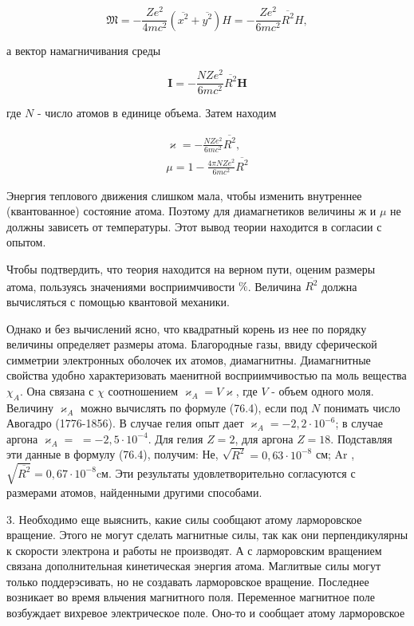 \documentclass[12pt]{article}
\begin{document}
  $$
  \mathfrak{M}=-\frac{Z e^2}{4 m c^2}\left(\overline{x^2}+\overline{y^2}\right) H=-\frac{Z e^2}{6 m c^2} \overline{R^2} H,
  $$


  а вектор намагничивания среды

  $$
  \mathbf{I}=-\frac{N Z e^2}{6 m c^2} \overline{R^2} \mathbf{H}
  $$


  где $N$ - число атомов в единице объема. Затем находим

  $$
  \begin{gathered}
  \varkappa=-\frac{N Z e^2}{6 m c^2} \overline{R^2}, \\
  \mu=1-\frac{4 \pi N Z e^2}{6 m c^2} \overline{R^2}
  \end{gathered}
  $$


  Энергия теплового движения слишком мала, чтобы изменить внутреннее (квантованное) состояние атома. Поэтому для диамагнетиков величины $ж$ и $\mu$ не должны зависеть от температуры. Этот вывод теории находится в согласии с опытом.

  Чтобы подтвердить, что теория находится на верном пути, оценим размеры атома, пользуясь значениями восприимчивости $\%$. Величина $\overline{R^2}$ должна вычисляться с помощью квантовой механики.

  Однако и без вычислений ясно, что квадратный корень из нее по порядку величины определяет размеры атома. Благородные газы, ввиду сферической симметрии электронных оболочек их атомов, диамагнитны. Диамагнитные свойства удобно характеризовать маенитной восприимчивостью па моль вещества $\chi_A$. Она связана с $\chi$ соотношением $\varkappa_A=V \varkappa$, где $V$ - объем одного моля. Величину $\varkappa_A$ можно вычислять по формуле (76.4), если под $N$ понимать число Авогадро (1776-1856). В случае гелия опыт дает $\varkappa_A=-2,2 \cdot 10^{-6}$; в случае аргона $\varkappa_A=$ $=-2,5 \cdot 10^{-4}$. Для гелия $Z=2$, для аргона $Z=18$. Подставляя
  эти данные в формулу (76.4), получим: Не, $\sqrt{R^2}=0,63 \cdot 10^{-8}$ см; Ar , $\sqrt{\overline{R^2}}=0,67 \cdot 10^{-8} \mathrm{cм}$. Эти результаты удовлетворительно согласуются с размерами атомов, найденными другими способами.

  3. Необходимо еще выяснить, какие силы сообщают атому ларморовское вращение. Этого не могут сделать магнитные силы, так как они перпендикулярны к скорости электрона и работы не производят. А с ларморовским вращением связана дополнительная кинетическая энергия атома. Маглитвые силы могут только поддерэсивать, но не создавать ларморовское вращение. Последнее возникает во время вльчения магнитного поля. Переменное магнитное поле возбуждает вихревое электрическое поле. Оно-то и сообщает атому ларморовское
\end{document}
